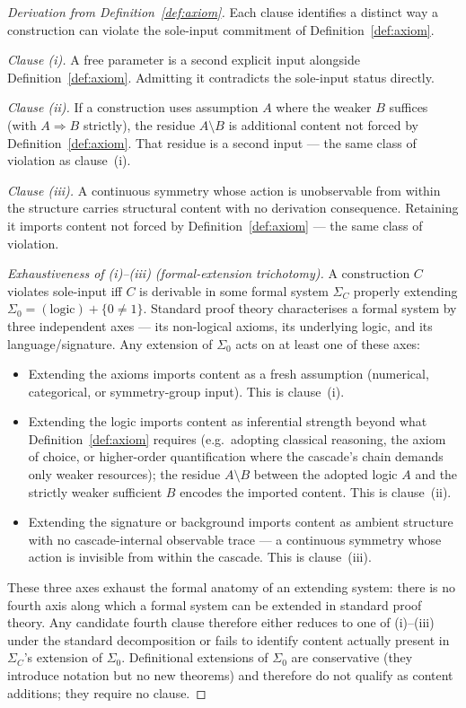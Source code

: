 \documentclass[11pt,a4paper]{article}
\begin{document}
\begin{proof}[Derivation from Definition~\ref{def:axiom}]
Each clause identifies a distinct way a construction can violate the
sole-input commitment of Definition~\ref{def:axiom}.

\emph{Clause (i).} A free parameter is a second explicit input alongside
Definition~\ref{def:axiom}. Admitting it contradicts the sole-input
status directly.

\emph{Clause (ii).} If a construction uses assumption $A$ where the
weaker $B$ suffices (with $A\Rightarrow B$ strictly), the residue
$A\setminus B$ is additional content not forced by
Definition~\ref{def:axiom}. That residue is a second input --- the same
class of violation as clause~(i).

\emph{Clause (iii).} A continuous symmetry whose action is unobservable
from within the structure carries structural content with no derivation
consequence. Retaining it imports content not forced by
Definition~\ref{def:axiom} --- the same class of violation.

\emph{Exhaustiveness of (i)--(iii) (formal-extension trichotomy).} A
construction $C$ violates sole-input iff $C$ is derivable in some
formal system $\Sigma_C$ properly extending $\Sigma_0 = (\text{logic})
+ \{0\neq 1\}$. Standard proof theory characterises a formal system by
three independent axes --- its non-logical axioms, its underlying
logic, and its language/signature. Any extension of $\Sigma_0$ acts on
at least one of these axes:
\begin{itemize}
\item Extending the axioms imports content as a fresh assumption
(numerical, categorical, or symmetry-group input). This is clause~(i).
\item Extending the logic imports content as inferential strength
beyond what Definition~\ref{def:axiom} requires (e.g.\ adopting
classical reasoning, the axiom of choice, or higher-order quantification
where the cascade's chain demands only weaker resources); the residue
$A\setminus B$ between the adopted logic $A$ and the strictly weaker
sufficient $B$ encodes the imported content. This is clause~(ii).
\item Extending the signature or background imports content as ambient
structure with no cascade-internal observable trace --- a continuous
symmetry whose action is invisible from within the cascade. This is
clause~(iii).
\end{itemize}
These three axes exhaust the formal anatomy of an extending system:
there is no fourth axis along which a formal system can be extended in
standard proof theory. Any candidate fourth clause therefore either
reduces to one of (i)--(iii) under the standard decomposition or fails
to identify content actually present in $\Sigma_C$'s extension of
$\Sigma_0$. Definitional extensions of $\Sigma_0$ are conservative
(they introduce notation but no new theorems) and therefore do not
qualify as content additions; they require no clause.


\end{proof}
\end{document}
